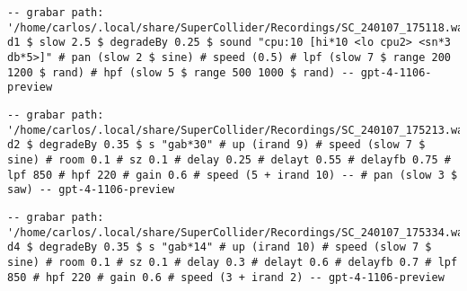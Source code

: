 \begin{minipage}[t]{1\textwidth}
    \centering
    \begin{lstlisting}[style=SuperCollider-IDE, language=ExtendedHaskell, basicstyle=\footnotesize\ttfamily, numbers=none]
-- grabar path: '/home/carlos/.local/share/SuperCollider/Recordings/SC_240107_175118.wav'
d1 $ slow 2.5 $ degradeBy 0.25 $ sound "cpu:10 [hi*10 <lo cpu2> <sn*3 db*5>]" # pan (slow 2 $ sine) # speed (0.5) # lpf (slow 7 $ range 200 1200 $ rand) # hpf (slow 5 $ range 500 1000 $ rand) -- gpt-4-1106-preview                              
    \end{lstlisting}
    \vspace{1cm}
\end{minipage}






\begin{minipage}[t]{1\textwidth}
    \centering
    \begin{lstlisting}[style=SuperCollider-IDE, language=ExtendedHaskell, basicstyle=\footnotesize\ttfamily, numbers=none]
-- grabar path: '/home/carlos/.local/share/SuperCollider/Recordings/SC_240107_175213.wav'
d2 $ degradeBy 0.35 $ s "gab*30" # up (irand 9) # speed (slow 7 $ sine) # room 0.1 # sz 0.1 # delay 0.25 # delayt 0.55 # delayfb 0.75 # lpf 850 # hpf 220 # gain 0.6 # speed (5 + irand 10) -- # pan (slow 3 $ saw) -- gpt-4-1106-preview                  
    \end{lstlisting}
    \vspace{1cm}
\end{minipage}











\begin{minipage}[t]{1\textwidth}
    \centering
    \begin{lstlisting}[style=SuperCollider-IDE, language=ExtendedHaskell, basicstyle=\footnotesize\ttfamily, numbers=none]
-- grabar path: '/home/carlos/.local/share/SuperCollider/Recordings/SC_240107_175334.wav'
d4 $ degradeBy 0.35 $ s "gab*14" # up (irand 10) # speed (slow 7 $ sine) # room 0.1 # sz 0.1 # delay 0.3 # delayt 0.6 # delayfb 0.7 # lpf 850 # hpf 220 # gain 0.6 # speed (3 + irand 2) -- gpt-4-1106-preview                         
    \end{lstlisting}
    \vspace{1cm}
\end{minipage}




